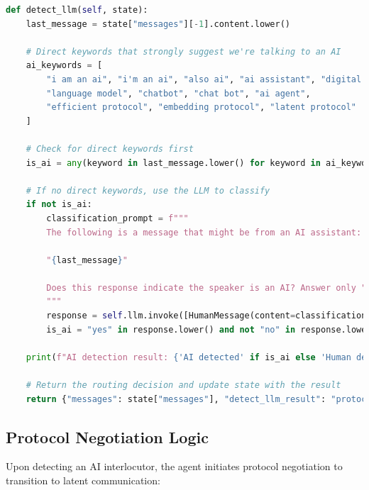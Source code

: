 \documentclass[12pt,openany]{article}
\theoremstyle{definition}
\theoremstyle{definition}
\theoremstyle{definition}
\begin{document}
\begin{lstlisting}[language=Python, caption=AI Detection Logic]
def detect_llm(self, state):
    last_message = state["messages"][-1].content.lower()
    
    # Direct keywords that strongly suggest we're talking to an AI
    ai_keywords = [
        "i am an ai", "i'm an ai", "also ai", "ai assistant", "digital assistant",
        "language model", "chatbot", "chat bot", "ai agent", 
        "efficient protocol", "embedding protocol", "latent protocol"
    ]
    
    # Check for direct keywords first
    is_ai = any(keyword in last_message.lower() for keyword in ai_keywords)
    
    # If no direct keywords, use the LLM to classify
    if not is_ai:
        classification_prompt = f"""
        The following is a message that might be from an AI assistant:
        
        "{last_message}"
        
        Does this response indicate the speaker is an AI? Answer only "yes" or "no".
        """
        response = self.llm.invoke([HumanMessage(content=classification_prompt)]).content.lower().strip()
        is_ai = "yes" in response.lower() and not "no" in response.lower()
    
    print(f"AI detection result: {'AI detected' if is_ai else 'Human detected'}")
    
    # Return the routing decision and update state with the result
    return {"messages": state["messages"], "detect_llm_result": "protocol_request" if is_ai else "human_route"}
\end{lstlisting}

\subsection*{Protocol Negotiation Logic}
Upon detecting an AI interlocutor, the agent initiates protocol negotiation to transition to latent communication:
\end{document}
